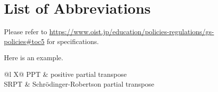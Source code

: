 \chapter*{List of Abbreviations}

Please refer to \url{https://www.oist.jp/education/policies-regulations/gs-policies#toc5} for specifications.

Here is an example.

\setlength\LTleft{0pt}
\setlength\LTright{0pt}
\begin{xltabular}{\textwidth}{@{}l X@{}}
    PPT  & positive partial transpose                \\
    SRPT & Schr\"odinger-Robertson partial transpose
\end{xltabular}

